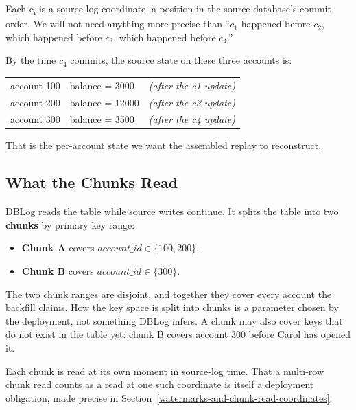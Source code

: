 \documentclass[letterpaper,10pt,twocolumn]{article}
\providecommand{\tightlist}{\setlength{\itemsep}{0pt}\setlength{\parskip}{0pt}}
\begin{document}
Each c\textsubscript{i} is a source-log coordinate, a position in the
source database's commit order. We will not need anything more precise
than ``$c_1$ happened before $c_2$, which
happened before $c_3$, which happened before
$c_4$.''

By the time $c_4$ commits, the source state on these three
accounts is:

\begin{center}\footnotesize
\begin{tabular}{@{}l@{\hskip 1em}l@{\hskip 1em}l@{}}
\ttfamily account 100 & \ttfamily balance = \phantom{0}3000 & \itshape (after the c1 update)\\
\ttfamily account 200 & \ttfamily balance = 12000           & \itshape (after the c3 update)\\
\ttfamily account 300 & \ttfamily balance = \phantom{0}3500 & \itshape (after the c4 update)\\
\end{tabular}
\end{center}

That is the per-account state we want the assembled replay to
reconstruct.

\subsection{What the Chunks Read}\label{what-the-chunks-read}

DBLog reads the table while source writes continue. It splits the table
into two \textbf{chunks} by primary key range:

\begin{itemize}
\tightlist
\item
  \textbf{Chunk A} covers $\mathit{account\_id} \in \{100, 200\}$.
\item
  \textbf{Chunk B} covers $\mathit{account\_id} \in \{300\}$.
\end{itemize}

The two chunk ranges are disjoint, and together they cover every
account the backfill claims. How the key space is split into chunks is
a parameter chosen by the deployment, not something DBLog infers. A
chunk may also cover keys that do not exist in the table yet: chunk B
covers account 300 before Carol has opened it.

Each chunk is read at its own moment in source-log time. That a
multi-row chunk read counts as a read at one such coordinate is itself
a deployment obligation, made precise in
Section~\ref{watermarks-and-chunk-read-coordinates}.
\end{document}
